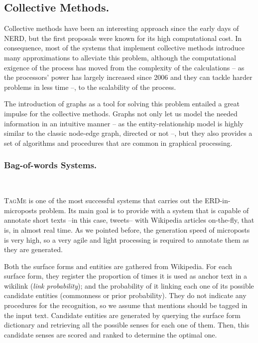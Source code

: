 \subsection{Collective Methods.}

Collective methods have been an interesting approach since the early days of NERD, but the first proposals were known for its high computational cost. In consequence, most of the systems that implement collective methods introduce many approximations to alleviate this problem, although the computational exigence of the process has moved from the complexity of the calculations -- as the processors' power has largely increased since 2006 and they can tackle harder problems in less time --, to the scalability of the process.

The introduction of graphs as a tool for solving this problem entailed a great impulse for the collective methods. Graphs not only let us model the needed information in an intuitive manner -- as the entity-relationship model is highly similar to the classic node-edge graph, directed or not --, but they also provides a set of algorithms and procedures that are common in graphical processing.

\subsubsection{Bag-of-words Systems.}~

\textsc{TagMe} \cite{ferragina2010} is one of the most successful systems that carries out the ERD-in-microposts problem. Its main goal is to provide with a system that is capable of annotate short texts --in this case, tweets-- with Wikipedia articles on-the-fly, that is, in almost real time. As we pointed before, the generation speed of microposts is very high, so a very agile and light processing is required to annotate them as they are generated.

Both the surface forms and entities are gathered from Wikipedia. For each surface form, they register the proportion of times it is used as anchor text in a wikilink (\emph{link probability}); and the probability of it linking each one of its possible candidate entities (commonness or prior probability). They do not indicate any procedures for the recognition, so we assume that mentions should be tagged in the input text.  Candidate entities are generated by querying the surface form dictionary and retrieving all the possible senses for each one of them. Then, this candidate senses are scored and ranked to determine the optimal one. 

